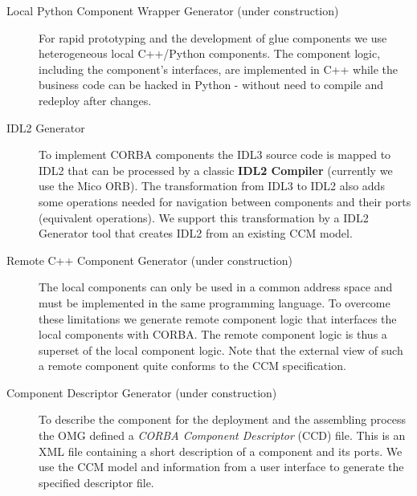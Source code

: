 \begin{description}
\item [Local Python Component Wrapper Generator (under construction)]
For rapid prototyping and the development of glue components we use
heterogeneous local C++/Python components. The component logic, including the
component's interfaces, are implemented in C++ while the business code can be
hacked in Python - without need to compile and redeploy after changes.

\item [IDL2 Generator]
To implement CORBA components the IDL3 source code is mapped to IDL2 that can be
processed by a classic {\bf IDL2 Compiler} (currently we use the Mico ORB). The
transformation from IDL3 to IDL2 also adds some operations needed for navigation
between components and their ports (equivalent operations). We support this
transformation by a IDL2 Generator tool that creates IDL2 from an existing CCM
model.

\item [Remote C++ Component Generator (under construction)]
The local components can only be used in a common address space and must be
implemented in the same programming language. To overcome these limitations we
generate remote component logic that interfaces the local components with CORBA.
The remote component logic is thus a superset of the local component logic. Note
that the external view of such a remote component quite conforms to the CCM
specification.

\item [Component Descriptor Generator (under construction)]
To describe the component for the deployment and the assembling process the OMG
defined a {\it CORBA Component Descriptor} (CCD) file. This is an XML file
containing a short description of a component and its ports. We use the CCM
model and information from a user interface to generate the specified descriptor
file.

\end{description}


